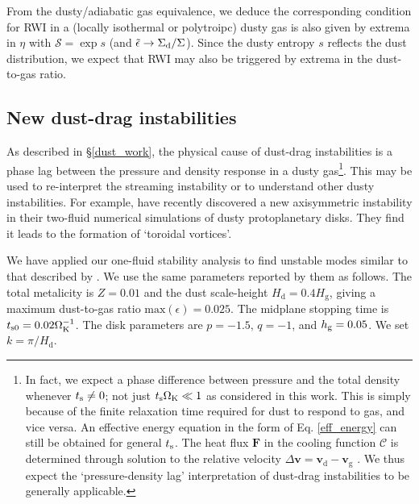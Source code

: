 From the dusty/adiabatic gas equivalence, we deduce the corresponding
condition for RWI in a (locally isothermal or polytroipc) dusty gas is
also given by extrema in $\eta$ with $\mathcal{S} = \exp{s}$ (and
$\tilde{\epsilon}\to \Sigma_\mathrm{d}/\Sigma$). Since
the dusty entropy $s$ reflects the dust distribution, we expect that
RWI may also be triggered by extrema in  the dust-to-gas ratio. 



\subsection{New dust-drag
  instabilities}\label{dust_as_thermo} 

As described in \S\ref{dust_work}, 
the physical cause of dust-drag instabilities is a phase lag between
the pressure and density response in a dusty gas\footnote{
In fact, we expect a phase difference between pressure and the total
density  whenever $t_\mathrm{s}\neq0$; not just $t_\mathrm{s}\Omega_{\rm K}\ll 1$ as 
considered in this work. This is simply because of the finite
relaxation time required for dust to respond to gas, and vice versa. 
An effective energy equation in the form of Eq. \ref{eff_energy} can
still be obtained for general $t_\mathrm{s}$. The
heat flux $\bm{F}$ in the cooling function $\mathcal{C}$ is determined
through solution to the relative velocity $\Delta \bm{v} =
\bm{v}_\mathrm{d}-\bm{v}_\mathrm{g}$ \citep{youdin05a,laibe14}.  We
thus expect the `pressure-density lag' interpretation of dust-drag 
instabilities to be generally applicable.}. 
This may be used to re-interpret the streaming instability or to
understand other dusty instabilities. For example,
\cite{loren15,loren16} have recently discovered a new axisymmetric 
instability in their two-fluid numerical simulations of dusty
protoplanetary disks. They find it leads to the formation of
`toroidal vortices'. 

We have applied our one-fluid stability analysis to find unstable modes  
similar to that described by \cite{loren15}. We use the same
parameters reported by them as follows. 
The total metalicity is $Z=0.01$ and the dust scale-height $H_\mathrm{d} =
0.4H_\mathrm{g}$, giving a maximum dust-to-gas ratio
$\mathrm{max}(\epsilon) = 0.025$. The midplane stopping time is 
$t_\mathrm{s0}=0.02\Omega_{\rm K}^{-1}$. The disk parameters are $p=-1.5,\, q=-1$, and  
$h_\mathrm{g}=0.05$. We set $k = \pi/H_\mathrm{d}$.      

